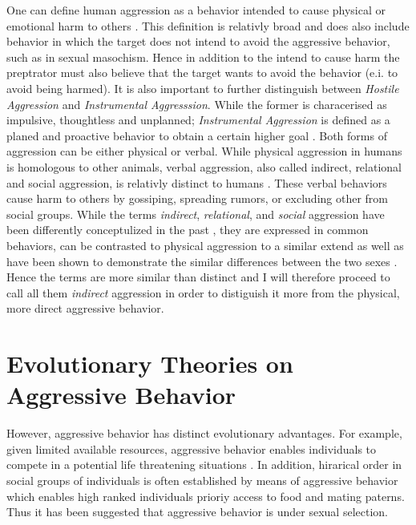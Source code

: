 One can define human aggression as a behavior intended to cause physical or emotional harm to others \cite{Anderson2002}.
This definition is relativly broad and does also include behavior in which the target does not intend to avoid the aggressive behavior, such as in sexual masochism.
Hence in addition to the intend to cause harm the preptrator must also believe that the target wants to avoid the behavior\cite{Berkowitz1993,Baumeister1989,Baron2007,Geen2001} (e.i. to avoid being harmed).  
It is also important to further distinguish between \textit{Hostile Aggression} and \textit{Instrumental Aggresssion}.
While the former is characerised as impulsive, thoughtless and unplanned; \textit{Instrumental Aggression} is defined as a planed and proactive behavior to obtain a certain higher goal \cite{Berkowitz1993,Geen2001}.
Both forms of aggression can be either physical or verbal.
While physical aggression in humans is homologous to other animals, verbal aggression, also called indirect, relational and social aggression, is relativly distinct to humans \cite{Archer2005}.
These verbal behaviors cause harm to others by gossiping, spreading rumors, or excluding other from social groups.
While the terms \textit{indirect}, \textit{relational}, and \textit{social} aggression have been differently conceptulized in the past \cite{Archer2001}, they are expressed in common behaviors, can be contrasted to physical aggression to a similar extend as well as have been shown to demonstrate the similar differences between the two sexes \cite{Archer2004}.
Hence the terms are more similar than distinct and I will therefore proceed to call all them \textit{indirect} aggression in order to distiguish it more from the physical, more direct aggressive behavior.






\section{Evolutionary Theories on Aggressive Behavior}
\label{sec:evolutionary_theories_on_aggressive_behavior}

However, aggressive behavior has distinct evolutionary advantages.
For example, given limited available resources, aggressive behavior enables individuals to compete in a potential life threatening situations \cite[]{Anholt2012}.
In addition, hirarical order in social groups of individuals is often established by means of aggressive behavior which enables high ranked individuals prioriy access to food and mating paterns. 
Thus it has been suggested that aggressive behavior is under sexual selection\cite{Lindenfors2011}.

